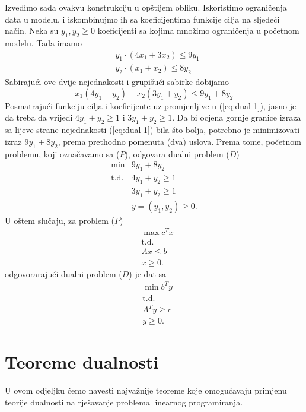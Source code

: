 \documentclass[a4paper, utf8, 11pt, colorlinks]{book}
\theoremstyle{definition}
\begin{document}
Izvedimo sada ovakvu konstrukciju u opštijem obliku. Iskoristimo ograničenja data u modelu, i iskombinujmo ih sa koeficijentima funkcije cilja na sljedeći način. Neka su $y_1, y_2 \geq 0$ koeficijenti sa kojima množimo ograničenja u početnom modelu. Tada imamo 
\begin{align*}
    &y_1 \cdot (4x_1 + 3x_2) \leq 9 y_1 \\
    &y_2 \cdot (x_1 + x_2 ) \leq 8 y_2 
\end{align*}
Sabirajući ove dvije nejednakosti i grupišući sabirke dobijamo 
\begin{equation}\label{eq:dual-1}
     x_1 ( 4 y_1 + y_2 ) + x_2 ( 3 y_1 + y_2 ) \leq 9 y_1 + 8 y_2 
\end{equation}
Posmatrajući funkciju cilja i koeficijente uz promjenljive u (\ref{eq:dual-1}), jasno je da treba da vrijedi 
$4 y_1 + y_2 \geq 1$ i $3 y_1 + y_2 \geq 1$. Da bi ocjena gornje granice   izraza sa lijeve strane nejednakosti (\ref{eq:dual-1}) bila što bolja,   potrebno je minimizovati izraz $9y_1 + 8 y_2$, prema prethodno pomenuta (dva) uslova. Prema tome, početnom problemu, koji označavamo sa ($P$), odgovara dualni problem ($D$)
$$\begin{array}{ll}
     \min                    &  9 y_1+ 8 y_2        \\
       \mbox{t.d.}   &  4 y_1     +   y_2 \geq 1   \\
                             &  3 y_1 + y_2 \geq 1 \\
                  &            y=(y_1,y_2) \geq 0.
\end{array}$$
U oštem slučaju,  za problem ($P$) %
\begin{align*}
	& \max c^T x  \\
	& \mbox{t.d.} \nonumber \\
	& A x \leq b \\
	& x \geq 0.
\end{align*}
odgovorarajući dualni problem ($D$)  je dat sa 
\begin{align*}
     & \min b^T y  \\
     & \mbox{t.d.} \nonumber \\
     & A^T y \geq c \\
     & y \geq 0.
\end{align*}

\section{Teoreme dualnosti}
U ovom odjeljku ćemo navesti najvažnije teoreme koje omogućavaju primjenu teorije dualnosti na rješavanje problema linearnog programiranja.
\end{document}
